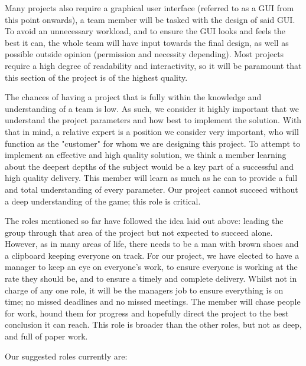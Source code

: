 \documentclass[11pt]{article}
\begin{document}
Many projects also require a graphical user interface (referred to
as a GUI from this point onwards), a team member will be tasked with
the design of said GUI. To avoid an unnecessary workload, and to
ensure the GUI looks and feels the best it can, the whole team will
have input towards the final design, as well as possible outside
opinion (permission and necessity depending). Most projects  require
a high degree of readability and interactivity, so it will be
paramount that this section of the project is of the highest
quality.

The chances of having a project that is fully within the knowledge
and understanding of a team is low. As such, we consider it highly
important that we understand the project parameters and how best to
implement the solution. With that in mind, a relative expert is a
position we consider very important, who will function as the
"customer" for whom we are designing this project. To attempt to
implement an effective and high quality solution, we think a member
learning about the deepest depths of the subject would be a key part
of a successful and high quality delivery. This member will learn as
much as he can to provide a full and total understanding of every
parameter. Our project cannot succeed without a deep understanding
of the game; this role is critical.

The roles mentioned so far have followed the idea laid out above:
leading the group through that area of the project but not expected
to succeed alone. However, as in many areas of life, there needs to
be a man with brown shoes and a clipboard keeping everyone on track.
For our project, we have elected to have a manager to keep an eye on
everyone's work, to ensure everyone is working at the rate they
should be, and to ensure a timely and complete delivery. Whilst not
in charge of any one role, it will be the managers job to ensure
everything is on time; no missed deadlines and no missed meetings.
The member will chase people for work, hound them for progress and
hopefully direct the project to the best conclusion it can reach.
This role is broader than the other roles, but not as deep, and full
of paper work.

Our suggested roles currently are:\\
\end{document}
